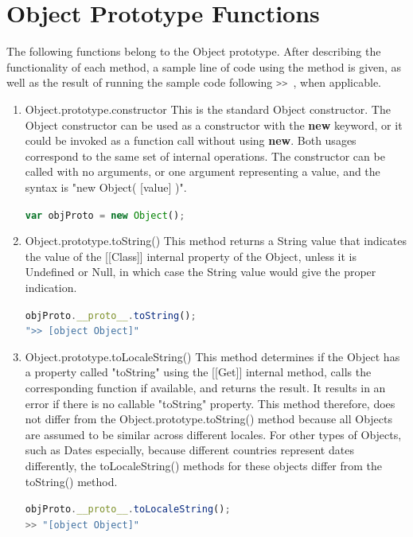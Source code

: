 \documentclass[a4paper,11pt,twoside]{report}
\def\jsinline{\lstinline[language=JavaScript, basicstyle=\small]}
\begin{document}
\section{Object Prototype Functions}
The following functions belong to the Object prototype. After describing the functionality of each method, a sample line of code using the method is given, as well as the result of running the sample code following \jsinline|>> |, when applicable.

\begin{enumerate}
\item Object.prototype.constructor \newline
This is the standard Object constructor. The Object constructor can be used as a constructor with the \textbf{new} keyword, or it could be invoked as a function call without using \textbf{new}. Both usages correspond to the same set of internal operations. The constructor can be called with no arguments, or one argument representing a value, and the syntax is "new Object( [value] )".

\jsinline|var objProto = new Object();|

\item Object.prototype.toString() \newline
This method returns a String value that indicates the value of the [[Class]] internal property of the Object, unless it is Undefined or Null, in which case the String value would give the proper indication.

\jsinline|objProto.__proto__.toString();| \\
\jsinline|">> [object Object]"|

\item Object.prototype.toLocaleString() \newline
This method determines if the Object has a property called "toString" using the [[Get]] internal method, calls the corresponding function if available, and returns the result. It results in an error if there is no callable "toString" property. This method therefore, does not differ from the Object.prototype.toString() method because all Objects are assumed to be similar across different locales. For other types of Objects, such as Dates especially, because different countries represent dates differently, the toLocaleString() methods for these objects differ from the toString() method.

\jsinline|objProto.__proto__.toLocaleString();| \\
\jsinline|>> "[object Object]"|


\end{enumerate}
\end{document}
